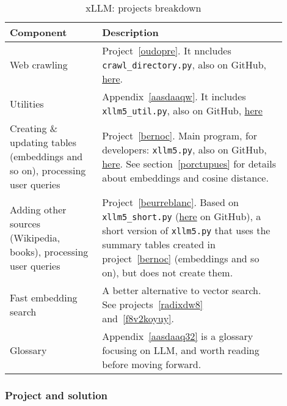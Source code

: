 \documentclass[oneside,10pt]{book}
\begin{document}
\begin{table}[ht]
    \centering
    \begin{tabular}{|p{0.3\linewidth} | p{0.6\linewidth}|}
     \hline
      Component  & Description \\ 
     \hline
    \hline

      Web crawling &  Project~\ref{oudopre}. It nncludes \texttt{crawl\_directory.py}, also on GitHub, 
 \href{https://github.com/VincentGranville/Large-Language-Models/blob/main/crawl_directory.py}{here}.\\
     \hline

      Utilities & Appendix~\ref{aasdaaqw}. It includes \texttt{xllm5\_util.py}, also on GitHub, \href{https://github.com/VincentGranville/Large-Language-Models/blob/main/xllm5/xllm5_util.py}{here}\\
\hline

Creating \& updating tables (embeddings and so on), processing user queries & Project~\ref{bernoc}. Main program, for developers: 
\texttt{xllm5.py}, also on GitHub, \href{https://github.com/VincentGranville/Large-Language-Models/blob/main/xllm5/xllm5.py}{here}. 
See section~\ref{porctupues} for details about embeddings and cosine distance.\\
\hline

Adding other sources (Wikipedia, books), processing user queries & Project~\ref{beurreblanc}. Based on 
\texttt{xllm5\_short.py} (\href{https://github.com/VincentGranville/Large-Language-Models/blob/main/xllm5/xllm5.py}{here} on GitHub), a short version of \texttt{xllm5.py} that uses the
 summary tables created in project~\ref{bernoc} (embeddings and so on), but does not create them. \\
     \hline

Fast embedding search & A better alternative to vector search. See projects~\ref{radixdw8} and~\ref{f8v2koyuy}.\\
\hline

Glossary & Appendix~\ref{aasdaaq32} is a glossary focusing on LLM, and worth reading before moving forward. \\
\hline

    \end{tabular}
    \caption{xLLM: projects breakdown}
    \label{tab:over4l}
\end{table}

\subsubsection{Project and solution}
\end{document}
